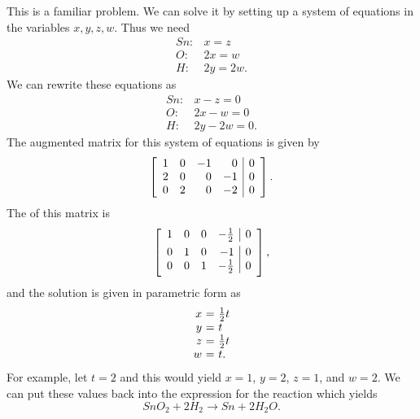 This is a familiar problem. We can solve it by setting up a system of equations 
in the variables $x,y,z,w$. Thus we need 
\begin{equation*}
\begin{array}{cl}
Sn: & x=z \\ 
O: & 2x=w \\ 
H: & 2y=2w.
\end{array}
\end{equation*}
We can rewrite these equations as
\begin{equation*}
\begin{array}{cl}
Sn: & x - z = 0 \\ 
O: & 2x - w = 0 \\ 
H: & 2y - 2w = 0.
\end{array}
\end{equation*}
The augmented matrix for this system of equations is given by 
\begin{equation*}
\left[ 
\begin{array}{rrrr|r}
1 & 0 & -1 & 0 & 0 \\ 
2 & 0 & 0 & -1 & 0 \\ 
0 & 2 & 0 & -2 & 0
\end{array}
\right].
\end{equation*}
The {\rref} of this matrix is 
\begin{equation*}
\leftB
\begin{array}{rrrr|r}
1 & 0 & 0 & -\vspace{0.05in}\frac{1}{2} & 0 \\ 
0 & 1 & 0 & -1 & 0 \\ 
0 & 0 & 1 & -\vspace{0.05in}\frac{1}{2} & 0
\end{array}
\rightB,
\end{equation*}
and the solution is given in parametric form as 
\begin{equation*}
\begin{array}{r@{~}c@{~}ll}
x &=& \frac{1}{2} t \\
y &=& t \\
z &=& \frac{1}{2}t \\
w &=& t.
\end{array}
\end{equation*}
For example, let $t=2$ and this would yield $x=1$, $y=2$, $z=1$, and
$w=2$. We can put these values back into the expression for the
reaction which yields
\begin{equation*}
SnO_{2}+2H_{2}\rightarrow Sn+2H_{2}O.
\end{equation*}
